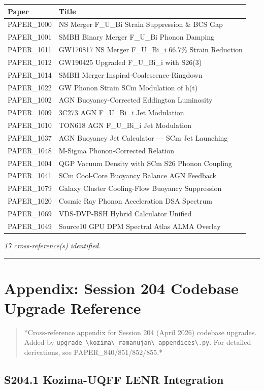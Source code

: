 \documentclass[12pt,a4paper]{article}
\begin{document}
\begin{table}[H]
\centering
\small
\begin{tabularx}{\linewidth}{@{}>{\raggedright\arraybackslash}X>{\raggedright\arraybackslash}X@{}}
\toprule
Paper & Title \tabularnewline
\midrule
PAPER\_1000 & NS Merger F\_{U\_Bi} Strain Suppression \& BCS Gap \tabularnewline
PAPER\_1001 & SMBH Binary Merger F\_{U\_Bi} Phonon Damping \tabularnewline
PAPER\_1011 & GW170817 NS Merger F\_{U\_Bi\_i} 66.7\% Strain Reduction \tabularnewline
PAPER\_1012 & GW190425 Upgraded F\_{U\_Bi\_i} with S26(3) \tabularnewline
PAPER\_1014 & SMBH Merger Inspiral-Coalescence-Ringdown \tabularnewline
PAPER\_1022 & GW Phonon Strain SCm Modulation of h(t) \tabularnewline
PAPER\_1002 & AGN Buoyancy-Corrected Eddington Luminosity \tabularnewline
PAPER\_1009 & 3C273 AGN F\_{U\_Bi\_i} Jet Modulation \tabularnewline
PAPER\_1010 & TON618 AGN F\_{U\_Bi\_i} Jet Modulation \tabularnewline
PAPER\_1037 & AGN Buoyancy Jet Calculator --- SCm Jet Launching \tabularnewline
PAPER\_1048 & M-Sigma Phonon-Corrected Relation \tabularnewline
PAPER\_1004 & QGP Vacuum Density with SCm S26 Phonon Coupling \tabularnewline
PAPER\_1041 & SCm Cool-Core Buoyancy Balance AGN Feedback \tabularnewline
PAPER\_1079 & Galaxy Cluster Cooling-Flow Buoyancy Suppression \tabularnewline
PAPER\_1020 & Cosmic Ray Phonon Acceleration DSA Spectrum \tabularnewline
PAPER\_1069 & VDS-DVP-BSH Hybrid Calculator Unified \tabularnewline
PAPER\_1049 & Source10 GPU DPM Spectral Atlas ALMA Overlay \tabularnewline
\bottomrule
\end{tabularx}
\end{table}

\emph{17 cross-reference(s) identified.}

\medskip\hrule\medskip

\section{Appendix: Session 204 Codebase Upgrade Reference}

\begin{quote}
*Cross-reference appendix for Session 204 (April 2026) codebase upgrades.
Added by \texttt{upgrade\_\textbackslash {kozima\textbackslash \_ramanujan\textbackslash \_appendices\textbackslash }.py}. For detailed derivations,
see PAPER\_840/851/852/855.*
\end{quote}

\subsection{S204.1 Kozima-UQFF LENR Integration}
\end{document}
